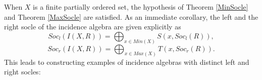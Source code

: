 \documentclass[12pt]{article}
\newtheorem{corollary}[theorem]{Corollary}
\begin{document}

\medskip 

When $X$ is a finite partially ordered set, the hypothesis of Theorem
\ref{MinSocle} and Theorem \ref{MaxSocle} are satisfied. As an immediate
corollary, the left and the right socle of the incidence algebra are given explicitly
as 
\begin{equation*}
Soc_l({I(X,R)}) = \bigoplus_{x \in Min(X)} S(x,Soc_l(R)),
\end{equation*} 
\begin{equation*}
Soc_r({I(X,R)}) = \bigoplus_{x \in Max(X)} T(x,Soc_r(R)).
\end{equation*}
This leads to constructing examples of incidence algebras with distinct left and right socles:

\end{document}
